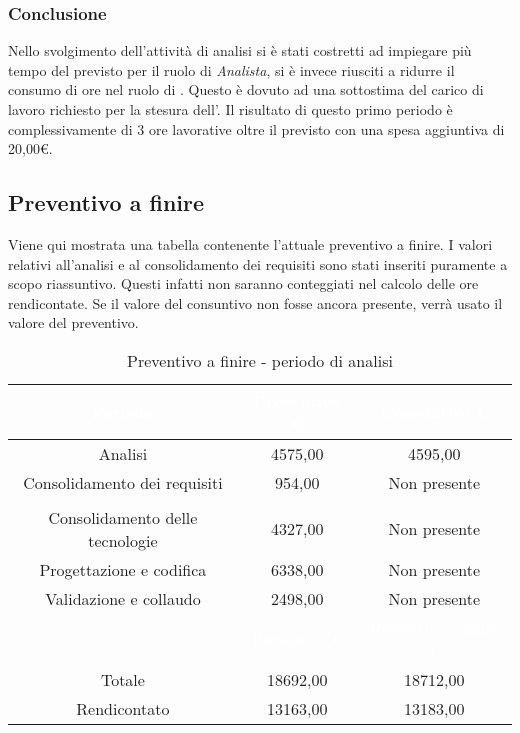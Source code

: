 \subsubsection{Conclusione}
Nello svolgimento dell'attività di analisi si è stati costretti ad impiegare più tempo del previsto per il ruolo di \textit{Analista}, si è invece riusciti a ridurre il consumo di ore nel ruolo di {\Amministratore}. Questo è dovuto ad una sottostima del carico di lavoro richiesto per la stesura dell'. Il risultato di questo primo periodo è complessivamente di 3 ore lavorative oltre il previsto con una spesa aggiuntiva di 20,00€.
\subsection{Preventivo a finire}
Viene qui mostrata una tabella contenente l'attuale preventivo a finire. I valori relativi all'analisi e al consolidamento dei requisiti sono stati inseriti puramente a scopo riassuntivo. Questi infatti non saranno conteggiati nel calcolo delle ore rendicontate. Se il valore del consuntivo non fosse ancora presente, verrà usato il valore del preventivo.
\begin{table}[H]
	\centering
	\begin{tabular}{|c|c|c|}
	\rowcolor{darkblue} 
		\textcolor{white}{Periodo}		&\textcolor{white}{Preventivo €}	&	\textcolor{white}{Consuntivo €}\\ \hline
		Analisi							&	4575,00				&	4595,00 \\ \hline
		Consolidamento dei requisiti	&	954,00				&	Non presente \\ \hline
		\rowcolor{darkblue} \multicolumn{3}{|c|}{\textcolor{white}{Rendicontato}}\\ \hline
		Consolidamento delle tecnologie	&	4327,00				&	Non presente \\ \hline
		Progettazione e codifica		&	6338,00				&	Non presente \\ \hline
		Validazione e collaudo			&	2498,00				&	Non presente \\ \hline
		\rowcolor{darkblue}		&\textcolor{white}{Preventivo €}&	\textcolor{white}{Preventivo a finire €}\\ \hline
		Totale							&	18692,00			&	18712,00 \\ \hline
		Rendicontato					&	13163,00			&	13183,00 \\ \hline
	\end{tabular}
	\caption{Preventivo a finire - periodo di analisi}
\end{table}